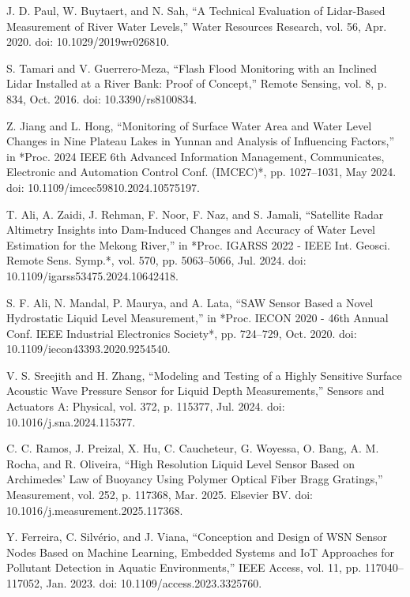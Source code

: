 \begin{thebibliography}{00}
 J. D. Paul, W. Buytaert, and N. Sah, 
``A Technical Evaluation of Lidar-Based Measurement of River Water Levels,'' 
Water Resources Research, vol. 56, Apr. 2020. doi: 10.1029/2019wr026810.

 S. Tamari and V. Guerrero-Meza, 
``Flash Flood Monitoring with an Inclined Lidar Installed at a River Bank: Proof of Concept,'' 
Remote Sensing, vol. 8, p. 834, Oct. 2016. doi: 10.3390/rs8100834.

 Z. Jiang and L. Hong, 
``Monitoring of Surface Water Area and Water Level Changes in Nine Plateau Lakes in Yunnan and Analysis of Influencing Factors,'' 
in *Proc. 2024 IEEE 6th Advanced Information Management, Communicates, Electronic and Automation Control Conf. (IMCEC)*, 
pp. 1027--1031, May 2024. doi: 10.1109/imcec59810.2024.10575197.

 T. Ali, A. Zaidi, J. Rehman, F. Noor, F. Naz, and S. Jamali, 
``Satellite Radar Altimetry Insights into Dam-Induced Changes and Accuracy of Water Level Estimation for the Mekong River,'' 
in *Proc. IGARSS 2022 - IEEE Int. Geosci. Remote Sens. Symp.*, vol. 570, pp. 5063--5066, Jul. 2024. 
doi: 10.1109/igarss53475.2024.10642418.

 S. F. Ali, N. Mandal, P. Maurya, and A. Lata, 
``SAW Sensor Based a Novel Hydrostatic Liquid Level Measurement,'' 
in *Proc. IECON 2020 - 46th Annual Conf. IEEE Industrial Electronics Society*, pp. 724--729, Oct. 2020. 
doi: 10.1109/iecon43393.2020.9254540.

 V. S. Sreejith and H. Zhang, 
``Modeling and Testing of a Highly Sensitive Surface Acoustic Wave Pressure Sensor for Liquid Depth Measurements,'' 
Sensors and Actuators A: Physical, vol. 372, p. 115377, Jul. 2024. doi: 10.1016/j.sna.2024.115377.

 C. C. Ramos, J. Preizal, X. Hu, C. Caucheteur, G. Woyessa, O. Bang, A. M. Rocha, and R. Oliveira, 
``High Resolution Liquid Level Sensor Based on Archimedes’ Law of Buoyancy Using Polymer Optical Fiber Bragg Gratings,'' 
Measurement, vol. 252, p. 117368, Mar. 2025. Elsevier BV. doi: 10.1016/j.measurement.2025.117368.

 Y. Ferreira, C. Silvério, and J. Viana, 
``Conception and Design of WSN Sensor Nodes Based on Machine Learning, Embedded Systems and IoT Approaches for Pollutant Detection in Aquatic Environments,'' 
IEEE Access, vol. 11, pp. 117040--117052, Jan. 2023. doi: 10.1109/access.2023.3325760.


\end{thebibliography}

